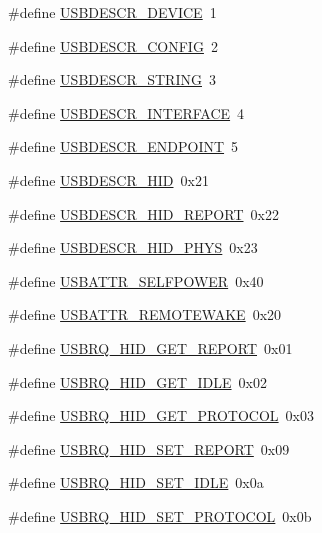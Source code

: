\begin{DoxyCompactItemize}
\item 
\#define \hyperlink{mhvlib-_vusb-_keyboard_2vusb_2usbdrv_8h_a5b76593f7b6295a4a599aba4476ec258}{U\-S\-B\-D\-E\-S\-C\-R\-\_\-\-D\-E\-V\-I\-C\-E}~1
\item 
\#define \hyperlink{mhvlib-_vusb-_keyboard_2vusb_2usbdrv_8h_a6ff1081ad7212a0c7009ef5b79f3669f}{U\-S\-B\-D\-E\-S\-C\-R\-\_\-\-C\-O\-N\-F\-I\-G}~2
\item 
\#define \hyperlink{mhvlib-_vusb-_keyboard_2vusb_2usbdrv_8h_aabd48b46ba597bd32ce5c64a7aad23c4}{U\-S\-B\-D\-E\-S\-C\-R\-\_\-\-S\-T\-R\-I\-N\-G}~3
\item 
\#define \hyperlink{mhvlib-_vusb-_keyboard_2vusb_2usbdrv_8h_a1ce81e6fb124d8747018b4343faa65ba}{U\-S\-B\-D\-E\-S\-C\-R\-\_\-\-I\-N\-T\-E\-R\-F\-A\-C\-E}~4
\item 
\#define \hyperlink{mhvlib-_vusb-_keyboard_2vusb_2usbdrv_8h_ab2c475dbe374ed8bc514893fb97a6083}{U\-S\-B\-D\-E\-S\-C\-R\-\_\-\-E\-N\-D\-P\-O\-I\-N\-T}~5
\item 
\#define \hyperlink{mhvlib-_vusb-_keyboard_2vusb_2usbdrv_8h_ade4fe1fba6aca94a379fdbacbbcc6800}{U\-S\-B\-D\-E\-S\-C\-R\-\_\-\-H\-I\-D}~0x21
\item 
\#define \hyperlink{mhvlib-_vusb-_keyboard_2vusb_2usbdrv_8h_af2ef6d7e2fe214a3d3a14f5419550bb0}{U\-S\-B\-D\-E\-S\-C\-R\-\_\-\-H\-I\-D\-\_\-\-R\-E\-P\-O\-R\-T}~0x22
\item 
\#define \hyperlink{mhvlib-_vusb-_keyboard_2vusb_2usbdrv_8h_a046aff487dd2c149d8df8ebf01a1f05d}{U\-S\-B\-D\-E\-S\-C\-R\-\_\-\-H\-I\-D\-\_\-\-P\-H\-Y\-S}~0x23
\item 
\#define \hyperlink{mhvlib-_vusb-_keyboard_2vusb_2usbdrv_8h_afa0dd9c06af4b033461ba3c755ca90bb}{U\-S\-B\-A\-T\-T\-R\-\_\-\-S\-E\-L\-F\-P\-O\-W\-E\-R}~0x40
\item 
\#define \hyperlink{mhvlib-_vusb-_keyboard_2vusb_2usbdrv_8h_a4f6ede34dea10d728413690ac694a74b}{U\-S\-B\-A\-T\-T\-R\-\_\-\-R\-E\-M\-O\-T\-E\-W\-A\-K\-E}~0x20
\item 
\#define \hyperlink{mhvlib-_vusb-_keyboard_2vusb_2usbdrv_8h_ab0c796905d6a7d0bfc605f8c3e252437}{U\-S\-B\-R\-Q\-\_\-\-H\-I\-D\-\_\-\-G\-E\-T\-\_\-\-R\-E\-P\-O\-R\-T}~0x01
\item 
\#define \hyperlink{mhvlib-_vusb-_keyboard_2vusb_2usbdrv_8h_aebf7c3254b56413d7679b89bb99e144c}{U\-S\-B\-R\-Q\-\_\-\-H\-I\-D\-\_\-\-G\-E\-T\-\_\-\-I\-D\-L\-E}~0x02
\item 
\#define \hyperlink{mhvlib-_vusb-_keyboard_2vusb_2usbdrv_8h_ac70990c038444434de16c30399e92640}{U\-S\-B\-R\-Q\-\_\-\-H\-I\-D\-\_\-\-G\-E\-T\-\_\-\-P\-R\-O\-T\-O\-C\-O\-L}~0x03
\item 
\#define \hyperlink{mhvlib-_vusb-_keyboard_2vusb_2usbdrv_8h_af0b62de651c6d73af4cfb1cee123c312}{U\-S\-B\-R\-Q\-\_\-\-H\-I\-D\-\_\-\-S\-E\-T\-\_\-\-R\-E\-P\-O\-R\-T}~0x09
\item 
\#define \hyperlink{mhvlib-_vusb-_keyboard_2vusb_2usbdrv_8h_a0d7b2ebb28c23a8bd2fb4a630b85ad71}{U\-S\-B\-R\-Q\-\_\-\-H\-I\-D\-\_\-\-S\-E\-T\-\_\-\-I\-D\-L\-E}~0x0a
\item 
\#define \hyperlink{mhvlib-_vusb-_keyboard_2vusb_2usbdrv_8h_a831d5e0db9e559706e54acc2e7b5278c}{U\-S\-B\-R\-Q\-\_\-\-H\-I\-D\-\_\-\-S\-E\-T\-\_\-\-P\-R\-O\-T\-O\-C\-O\-L}~0x0b
\end{DoxyCompactItemize}
